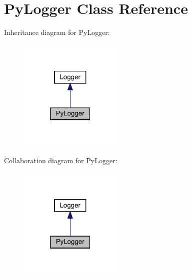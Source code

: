 \hypertarget{class_py_logger}{}\section{Py\+Logger Class Reference}
\label{class_py_logger}


Inheritance diagram for Py\+Logger\+:
\nopagebreak
\begin{figure}[H]
\begin{center}
\leavevmode
\includegraphics[width=139pt]{class_py_logger__inherit__graph}
\end{center}
\end{figure}


Collaboration diagram for Py\+Logger\+:
\nopagebreak
\begin{figure}[H]
\begin{center}
\leavevmode
\includegraphics[width=139pt]{class_py_logger__coll__graph}
\end{center}
\end{figure}

